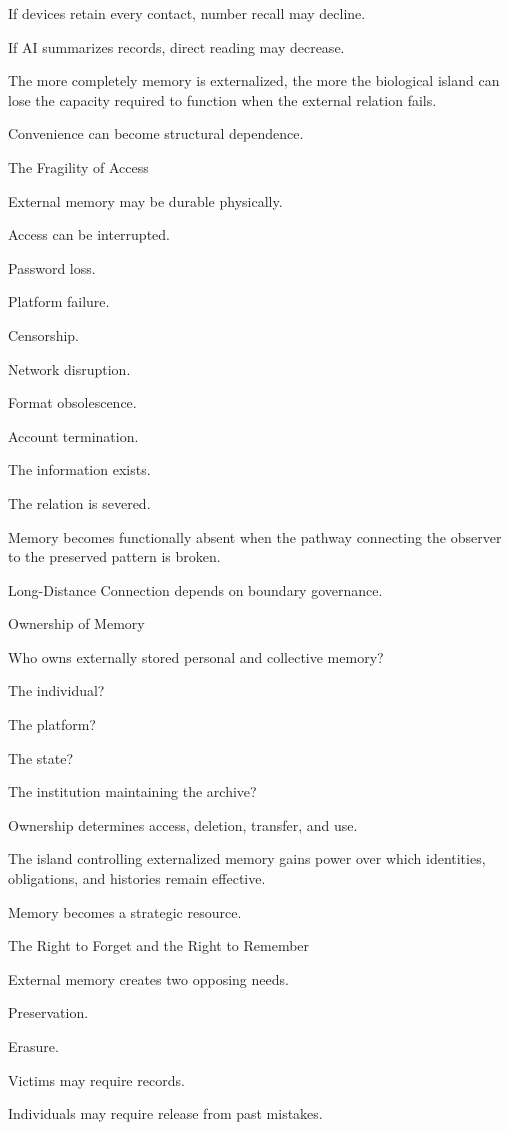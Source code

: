 If devices retain every contact, number recall may decline.

If AI summarizes records, direct reading may decrease.

The more completely memory is externalized, the more the biological island can lose the capacity required to function when the external relation fails.

Convenience can become structural dependence.

The Fragility of Access

External memory may be durable physically.

Access can be interrupted.

Password loss.

Platform failure.

Censorship.

Network disruption.

Format obsolescence.

Account termination.

The information exists.

The relation is severed.

Memory becomes functionally absent when the pathway connecting the observer to the preserved pattern is broken.

Long-Distance Connection depends on boundary governance.

Ownership of Memory

Who owns externally stored personal and collective memory?

The individual?

The platform?

The state?

The institution maintaining the archive?

Ownership determines access, deletion, transfer, and use.

The island controlling externalized memory gains power over which identities, obligations, and histories remain effective.

Memory becomes a strategic resource.

The Right to Forget and the Right to Remember

External memory creates two opposing needs.

Preservation.

Erasure.

Victims may require records.

Individuals may require release from past mistakes.

